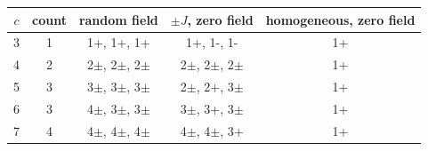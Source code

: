 \begin{tabular}{@{}ccccc@{}}
\hline\hline
$c$ & count & random field & $\pm J$, zero field & homogeneous, zero field\\
\hline
3 & 1 & 1+, 1+, 1+ & 1+, 1-, 1- & 1+\\
4 & 2 & 2$\pm$, 2$\pm$, 2$\pm$ & 2$\pm$, 2$\pm$, 2$\pm$ & 1+\\
5 & 3 & 3$\pm$, 3$\pm$, 3$\pm$ & 2$\pm$, 2+, 3$\pm$ & 1+\\
6 & 3 & 4$\pm$, 3$\pm$, 3$\pm$ & 3$\pm$, 3+, 3$\pm$ & 1+\\
7 & 4 & 4$\pm$, 4$\pm$, 4$\pm$ & 4$\pm$, 4$\pm$, 3+ & 1+\\
\hline\hline
\end{tabular}
